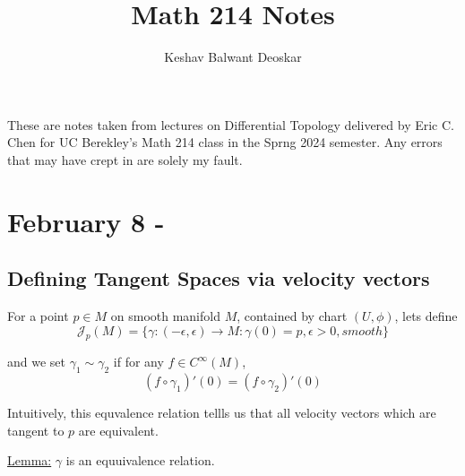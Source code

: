 \documentclass{article}
\title{Math 214 Notes}
\author{Keshav Balwant Deoskar}
\begin{document}
\maketitle

These are notes taken from lectures on Differential Topology delivered by Eric C. Chen for UC Berekley's Math 214 class in the Sprng 2024 semester. Any errors that may have crept in are solely my fault.

\tableofcontents

\pagebreak

\section{February 8 - }

\vskip 0.5cm

\subsection{Defining Tangent Spaces via velocity vectors}

\vskip 0.5cm
For a point $p \in M$ on smooth manifold $M$, contained by chart $(U, \phi)$, lets define 
\[ \mathcal{J}_p(M) = \{ \gamma : (-\epsilon, \epsilon) \rightarrow M : \gamma(0) = p , \epsilon > 0, smooth\} \]

and we set $\gamma_1 \sim \gamma_2$ if for any $f \in C^{\infty}(M)$, 
\[ \left( f \circ \gamma_1 \right)'(0) = \left( f \circ \gamma_2 \right)'(0) \]

Intuitively, this equvalence relation tellls us that all velocity vectors which are tangent to $p$ are equivalent.

\vskip 0.25cm
\begin{dottedbox}
  \underline{Lemma:} $\gamma$ is an equuivalence relation.
\end{dottedbox}
\end{document}
